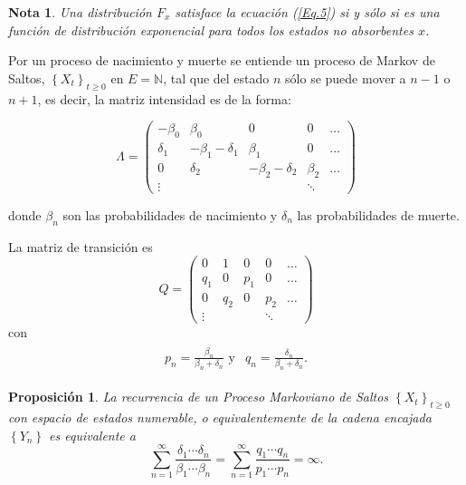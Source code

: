 \documentclass{article}
\newtheorem{Note}{Nota}[section]
\newtheorem{Prop}{Proposición}[section]
\newcommand{\nat}{\mathbb{N}}
\numberwithin{equation}{section}
\begin{document}
\begin{Note}
Una distribuci\'on $F_{x}$ satisface la ecuaci\'on (\ref{Eq.5}) si y s\'olo si es una funci\'on de distribuci\'on exponencial para todos los estados no absorbentes $x$.
\end{Note}

Por un proceso de nacimiento y muerte  se entiende un proceso de Markov de Saltos, $\left\{X_{t}\right\}_{t\geq0}$ en $E=\nat$, tal que del estado $n$ s\'olo se puede mover a $n-1$ o $n+1$, es decir, la matriz intensidad es de la forma:

\begin{equation}
\Lambda=\left(\begin{array}{ccccc}
-\beta_{0}&\beta_{0} & 0 & 0 & \ldots\\
\delta_{1}&-\beta_{1}-\delta_{1} & \beta_{1}&0&\ldots\\
0&\delta_{2}&-\beta_{2}-\delta_{2} & \beta_{2}&\ldots\\
\vdots & & & \ddots &
\end{array}\right)
\end{equation}

donde $\beta_{n}$ son las probabilidades de nacimiento y $\delta_{n}$ las probabilidades de muerte.

La matriz de transici\'on es
\begin{equation}
Q=\left(\begin{array}{ccccc}
0& 1 & 0 & 0 & \ldots\\
q_{1}&0 & p_{1}&0&\ldots\\
0&q_{2}&0& p_{2}&\ldots\\
\vdots & & & \ddots &
\end{array}\right)
\end{equation}
con 
\begin{eqnarray}
\begin{array}{ll}
p_{n}=\frac{\beta_{n}}{\beta_{n}+\delta_{n}}\textrm{  y}& q_{n}=\frac{\delta_{n}}{\beta_{n}+\delta_{n}}.
\end{array}
\end{eqnarray}

\begin{Prop}
La recurrencia de un Proceso Markoviano de Saltos
$\left\{X_{t}\right\}_{t\geq0}$ con espacio de estados numerable, o equivalentemente de la cadena encajada $\left\{Y_{n}\right\}$ es equivalente a
\begin{equation}\label{Eq.2.1}
\sum_{n=1}^{\infty}\frac{\delta_{1}\cdots\delta_{n}}{\beta_{1}\cdots\beta_{n}}=\sum_{n=1}^{\infty}\frac{q_{1}\cdots q_{n}}{p_{1}\cdots p_{n}}=\infty.
\end{equation}
\end{Prop}
\end{document}
